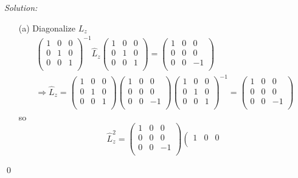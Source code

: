 \documentclass[12pt,a4paper]{article}
\newenvironment{sol}
    {\emph{Solution:}
    }
    {
    \qed
    }
\begin{document}
\begin{sol}
\begin{itemize}
\item[(a)] Diagonalize $L_z$
\begin{gather}
\left(\begin{array}{ccc}
1&0&0\\
0&1&0\\
0&0&1\\
\end{array}\right)^{-1}\hat{L}_z\left(\begin{array}{ccc}
1&0&0\\
0&1&0\\
0&0&1\\
\end{array}\right)=\left(\begin{array}{ccc}
1&0&0\\
0&0&0\\
0&0&-1\\
\end{array}\right)\\
\Longrightarrow\hat{L}_z=\left(\begin{array}{ccc}
1&0&0\\
0&1&0\\
0&0&1\\
\end{array}\right)\left(\begin{array}{ccc}
1&0&0\\
0&0&0\\
0&0&-1\\
\end{array}\right)\left(\begin{array}{ccc}
1&0&0\\
0&1&0\\
0&0&1\\
\end{array}\right)^{-1}=\left(\begin{array}{ccc}
1&0&0\\
0&0&0\\
0&0&-1\\
\end{array}\right)
\end{gather}
so
\begin{equation}
\hat{L}_z^2=\left(\begin{array}{ccc}
1&0&0\\
0&0&0\\
0&0&-1\\
\end{array}\right)\left(\begin{array}{ccc}
1&0&0\\

\end{array}
\end{equation}
\end{itemize}
\end{sol}
\end{document}
